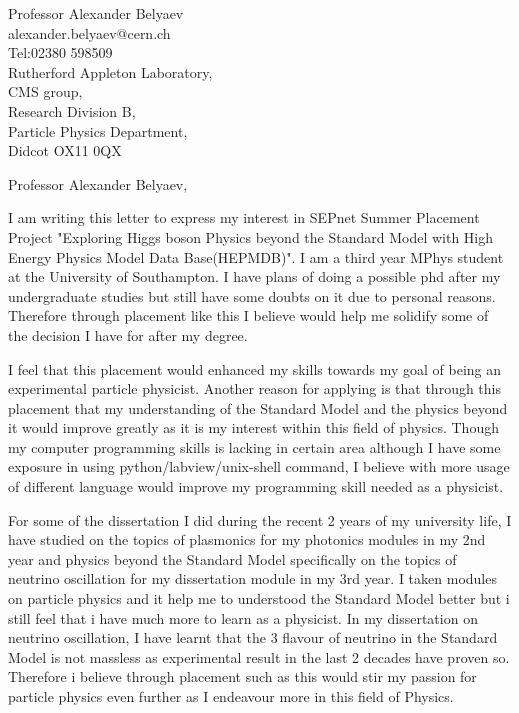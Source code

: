 \documentclass[10pt]{letter} %
\begin{document}

\begin{letter}{Professor Alexander Belyaev\\alexander.belyaev@cern.ch\\Tel:02380 598509\\Rutherford Appleton Laboratory,\\CMS group,\\Research Division B,\\Particle Physics Department,\\Didcot OX11 0QX}


\opening{Professor Alexander Belyaev,} 

I am writing this letter to express my interest in SEPnet Summer Placement Project "Exploring Higgs boson Physics beyond the Standard Model with High Energy Physics Model Data Base(HEPMDB)". I am a third year MPhys student at the University of Southampton. I have plans of doing a possible phd after my undergraduate studies but still have some doubts on it due to personal reasons. Therefore through placement like this I believe would help me solidify some of the decision I have for after my degree.

I feel that this placement would enhanced my skills towards my goal of being an experimental particle physicist. Another reason for applying is that through this placement that my understanding of the Standard Model and the physics beyond it would improve greatly as it is my interest within this field of physics. Though my computer programming skills is lacking in certain area although I have some exposure in using python/labview/unix-shell command, I believe with more usage of different language would improve my programming skill needed as a physicist.

For some of the dissertation I did during the recent 2 years of my university life, I have studied on the topics of plasmonics for my photonics modules in my 2nd year and physics beyond the Standard Model specifically on the topics of neutrino oscillation for my dissertation module in my 3rd year. I taken modules on particle physics and it help me to understood the Standard Model better but i still feel that i have much more to learn as a physicist. In my dissertation on neutrino oscillation, I have learnt that the 3 flavour of neutrino in the Standard Model is not massless as experimental result in the last 2 decades have proven so. Therefore i believe through placement such as this would stir my passion for particle physics even further as I endeavour more in this field of Physics.


\end{letter}
\end{document}
